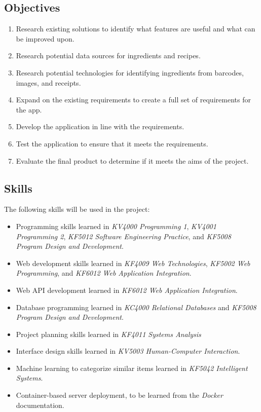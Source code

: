\documentclass[../CHEFCookingHelper.tex]{subfiles}
\begin{document}
\subsection{Objectives}

\begin{enumerate}
    \item Research existing solutions to identify what features are useful and what can be improved upon.
    \item Research potential data sources for ingredients and recipes.
    \item Research potential technologies for identifying ingredients from barcodes, images, and receipts.
    \item Expand on the existing requirements to create a full set of requirements for the \chef{} app.
    \item Develop the \chef{} application in line with the requirements.
    \item Test the \chef{} application to ensure that it meets the requirements.
    \item Evaluate the final product to determine if it meets the aims of the project.
\end{enumerate}

\subsection{Skills}
The following skills will be used in the project:

\begin{itemize}
    \item Programming skills learned in \textit{KV4000 Programming 1}, \textit{KV4001 Programming 2},
          \textit{KF5012 Software Engineering Practice}, and \textit{KF5008 Program Design and Development}.
    \item Web development skills learned in \textit{KF4009 Web Technologies}, \textit{KF5002 Web Programming},
          and \textit{KF6012 Web Application Integration}.
    \item Web API development learned in \textit{KF6012 Web Application Integration}.
    \item Database programming learned in \textit{KC4000 Relational Databases} and \textit{KF5008 Program Design and Development}.
    \item Project planning skills learned in \textit{KF4011 Systems Analysis}
    \item Interface design skills learned in \textit{KV5003 Human-Computer Interaction}.
    \item Machine learning to categorize similar items learned in \textit{KF5042 Intelligent Systems}.
    \item Container-based server deployment, to be learned from the \textit{Docker} documentation.
\end{itemize}
\end{document}
